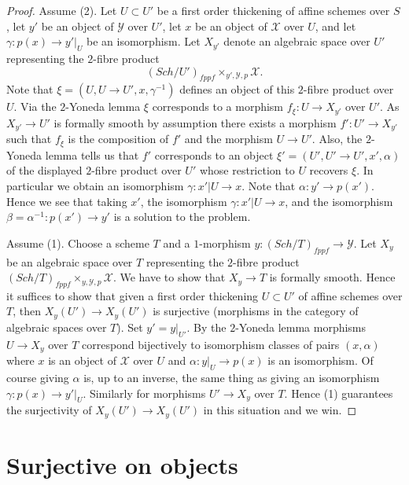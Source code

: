 \documentclass{stacks-project}
\theoremstyle{plain}
\theoremstyle{definition}
\theoremstyle{remark}
\numberwithin{equation}{subsection}
\def\Sch{\mathit{Sch}}
\begin{document}
\begin{proof}
Assume (2). Let $U \subset U'$ be a first order thickening
of affine schemes over $S$, let $y'$ be an object of $\mathcal{Y}$
over $U'$, let $x$ be an object of $\mathcal{X}$ over $U$,
and let $\gamma : p(x) \to y'|_U$ be an isomorphism. Let
$X_{y'}$ denote an algebraic space over $U'$ representing the $2$-fibre
product
$$
(\Sch/U')_{fppf} \times_{y', \mathcal{Y}, p} \mathcal{X}.
$$
Note that $\xi = (U, U \to U', x, \gamma^{-1})$ defines an object of
this $2$-fibre product over $U$. Via the $2$-Yoneda lemma $\xi$ corresponds
to a morphism $f_\xi : U \to X_{y'}$ over $U'$. As $X_{y'} \to U'$ is
formally smooth by assumption there exists a morphism
$f' : U' \to X_{y'}$ such that $f_\xi$ is the composition of $f'$
and the morphism $U \to U'$. Also, the $2$-Yoneda lemma tells us that
$f'$ corresponds to an object $\xi' = (U', U' \to U', x', \alpha)$ of
the displayed $2$-fibre product over $U'$ whose restriction to
$U$ recovers $\xi$. In particular we obtain an isomorphism
$\gamma : x'|U \to x$. Note that $\alpha : y' \to p(x')$.
Hence we see that taking $x'$, the isomorphism
$\gamma : x'|U \to x$, and the isomorphism
$\beta = \alpha^{-1} : p(x') \to y'$
is a solution to the problem.

\medskip\noindent
Assume (1). Choose a scheme $T$ and a $1$-morphism
$y : (\Sch/T)_{fppf} \to \mathcal{Y}$. Let
$X_y$ be an algebraic space over $T$ representing the $2$-fibre product
$(\Sch/T)_{fppf} \times_{y, \mathcal{Y}, p} \mathcal{X}$.
We have to show that $X_y \to T$ is formally smooth.
Hence it suffices to show that given a first order thickening
$U \subset U'$ of affine schemes over $T$, then
$X_y(U') \to X_y(U')$ is surjective (morphisms in the
category of algebraic spaces over $T$). Set $y' = y|_{U'}$.
By the $2$-Yoneda lemma morphisms $U \to X_y$ over $T$ correspond bijectively
to isomorphism classes of pairs $(x, \alpha)$ where $x$ is an object
of $\mathcal{X}$ over $U$ and $\alpha : y|_U \to p(x)$ is an isomorphism.
Of course giving $\alpha$ is, up to an inverse, the same thing as giving
an isomorphism $\gamma : p(x) \to y'|_U$.
Similarly for morphisms $U' \to X_y$ over $T$. Hence (1) guarantees
the surjectivity of $X_y(U') \to X_y(U')$
in this situation and we win.
\end{proof}







\section{Surjective on objects}
\label{section-formally-surjective}
\end{document}
